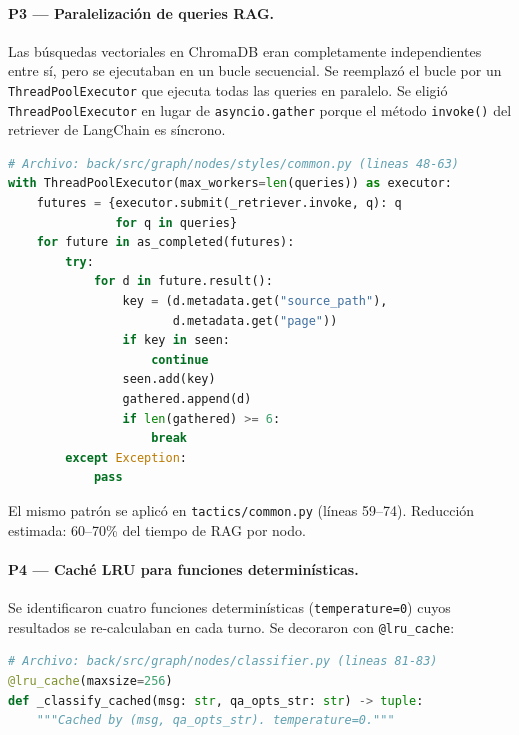 \documentclass[12pt, letterpaper, oneside]{article}
\begin{document}
\paragraph{P3 --- Paralelización de queries RAG.}
Las búsquedas vectoriales en ChromaDB eran completamente independientes entre sí,
pero se ejecutaban en un bucle secuencial. Se reemplazó el bucle por un
\texttt{ThreadPoolExecutor} que ejecuta todas las queries en paralelo. Se eligió
\texttt{ThreadPoolExecutor} en lugar de \texttt{asyncio.gather} porque el método
\texttt{invoke()} del retriever de LangChain es síncrono.

\begin{lstlisting}[language=Python,
  caption={Paralelización de queries RAG con \texttt{ThreadPoolExecutor}},
  label={lst:rag-parallel},
  firstnumber=48]
# Archivo: back/src/graph/nodes/styles/common.py (lineas 48-63)
with ThreadPoolExecutor(max_workers=len(queries)) as executor:
    futures = {executor.submit(_retriever.invoke, q): q
               for q in queries}
    for future in as_completed(futures):
        try:
            for d in future.result():
                key = (d.metadata.get("source_path"),
                       d.metadata.get("page"))
                if key in seen:
                    continue
                seen.add(key)
                gathered.append(d)
                if len(gathered) >= 6:
                    break
        except Exception:
            pass
\end{lstlisting}

El mismo patrón se aplicó en \texttt{tactics/common.py} (líneas 59--74).
Reducción estimada: 60--70\% del tiempo de RAG por nodo.

\paragraph{P4 --- Caché LRU para funciones determinísticas.}
Se identificaron cuatro funciones determinísticas (\texttt{temperature=0}) cuyos
resultados se re-calculaban en cada turno. Se decoraron con
\texttt{@lru\_cache}:

\begin{lstlisting}[language=Python,
  caption={Caché LRU en el clasificador},
  label={lst:lru-cache},
  firstnumber=81]
# Archivo: back/src/graph/nodes/classifier.py (lineas 81-83)
@lru_cache(maxsize=256)
def _classify_cached(msg: str, qa_opts_str: str) -> tuple:
    """Cached by (msg, qa_opts_str). temperature=0."""
\end{lstlisting}
\end{document}
